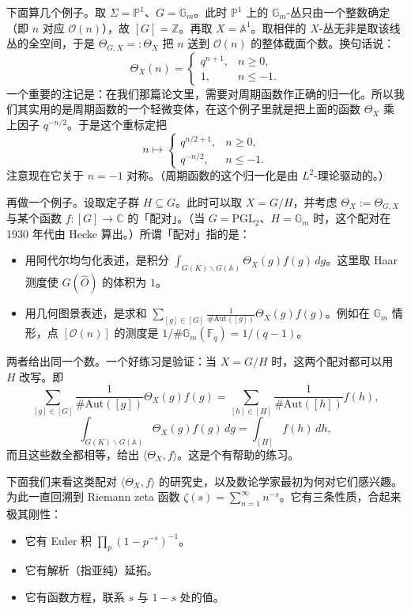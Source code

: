 下面算几个例子。取 $\Sigma=\mathbb P^1$、$G=\mathbb G_m$。此时 $\mathbb P^1$ 上的 $\mathbb G_m$-丛只由一个整数确定（即 $n$ 对应 $\mathcal O(n)$），故 $[G]=\mathbb Z$。再取 $X=\mathbb A^1$。取相伴的 $X$-丛无非是取该线丛的全空间，于是 $\Theta_{G,X}=:\Theta_X$ 把 $n$ 送到 $\mathcal O(n)$ 的整体截面个数。换句话说：
\[
  \Theta_X(n)=\begin{cases}q^{n+1},& n\ge0,\\ 1,& n\le-1.\end{cases}
\]
一个重要的注记是：在我们那篇论文里，需要对周期函数作正确的归一化。所以我们其实用的是周期函数的一个轻微变体，在这个例子里就是把上面的函数 $\Theta_X$ 乘上因子 $q^{-n/2}$。于是这个重标定把
\[
  n\mapsto\begin{cases}q^{n/2+1},& n\ge0,\\ q^{-n/2},& n\le-1.\end{cases}
\]
注意现在它关于 $n=-1$ 对称。（周期函数的这个归一化是由 $L^2$-理论驱动的。）

再做一个例子。设取定子群 $H\subseteq G$。此时可以取 $X=G/H$，并考虑 $\Theta_X:=\Theta_{G,X}$ 与某个函数 $f:[G]\to\mathbb C$ 的「配对」。（当 $G=\mathrm{PGL}_2$、$H=\mathbb G_m$ 时，这个配对在 1930 年代由 Hecke 算出。）所谓「配对」指的是：

\begin{itemize}[leftmargin=1.6em]
  \item 用阿代尔均匀化表述，是积分 $\int_{G(K)\backslash G(\mathbb A)}\Theta_X(g)f(g)\,dg$。这里取 Haar 测度使 $G(\hat O)$ 的体积为 $1$。
  \item 用几何图景表述，是求和 $\sum_{[g]\in[G]}\frac{1}{\#\mathrm{Aut}([g])}\Theta_X(g)f(g)$。例如在 $\mathbb G_m$ 情形，点 $[\mathcal O(n)]$ 的测度是 $1/\#\mathbb G_m(\mathbb F_q)=1/(q-1)$。
\end{itemize}

两者给出同一个数。一个好练习是验证：当 $X=G/H$ 时，这两个配对都可以用 $H$ 改写。即
\[
  \sum_{[g]\in[G]}\frac{1}{\#\mathrm{Aut}([g])}\Theta_X(g)f(g)=\sum_{[h]\in[H]}\frac{1}{\#\mathrm{Aut}([h])}f(h),
\]
\[
  \int_{G(K)\backslash G(\mathbb A)}\Theta_X(g)f(g)\,dg=\int_{[H]}f(h)\,dh,
\]
而且这些数全都相等，给出 $\langle\Theta_X,f\rangle$。这是个有帮助的练习。

下面我们来看这类配对 $\langle\Theta_X,f\rangle$ 的研究史，以及数论学家最初为何对它们感兴趣。为此一直回溯到 Riemann zeta 函数 $\zeta(s)=\sum_{n=1}^\infty n^{-s}$。它有三条性质，合起来极其刚性：

\begin{itemize}[leftmargin=1.6em]
  \item 它有 Euler 积 $\prod_p(1-p^{-s})^{-1}$。
  \item 它有解析（指亚纯）延拓。
  \item 它有函数方程，联系 $s$ 与 $1-s$ 处的值。
\end{itemize}

